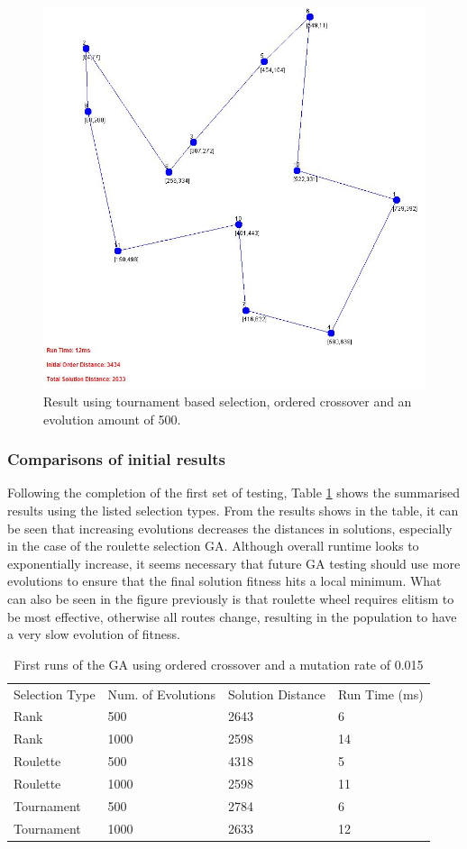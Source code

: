 \documentclass[article]{IEEEtran}
\begin{document}
\begin{figure}[H]
\centering
\includegraphics[width=.9\linewidth]{images/ordered_tournament_015_1000_true}
\caption{Result using tournament based selection, ordered crossover and an evolution amount of 500.}
\label{fig:13}
\end{figure}

\subsubsection{Comparisons of initial results}
Following the completion of the first set of testing, Table \ref{tab:1} shows the summarised results using the listed selection types. From the results shows in the table, it can be seen that increasing evolutions decreases the distances in solutions, especially in the case of the roulette selection GA. Although overall runtime looks to exponentially increase, it seems necessary that future GA testing should use more evolutions to ensure that the final solution fitness hits a local minimum. What can also be seen in the figure previously is that roulette wheel requires elitism to be most effective, otherwise all routes change, resulting in the population to have a very slow evolution of fitness.

\begin{table}[H]
\centering
\caption{First runs of the GA using ordered crossover and a mutation rate of 0.015}
\label{tab:1}
\begin{tabular}{llll}
Selection Type & Num. of Evolutions & Solution Distance & Run Time (ms) \\
Rank & 500 & 2643 & 6 \\
Rank & 1000 & 2598 & 14 \\
Roulette & 500 & 4318 & 5 \\
Roulette & 1000 & 2598 & 11 \\
Tournament & 500 & 2784 & 6 \\
Tournament & 1000 & 2633 & 12 
\end{tabular}
\end{table}
\end{document}
